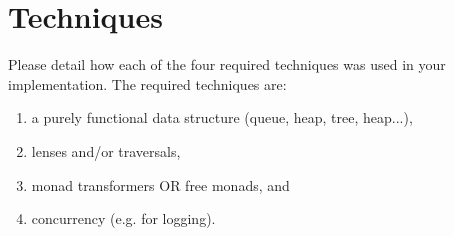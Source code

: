 \section{Techniques}

Please detail how each of the four required techniques was used in your implementation.
The required techniques are:
\begin{enumerate}
    \item a purely functional data structure (queue, heap, tree, heap...),
    \item lenses and/or traversals,
    \item monad transformers OR free monads, and
    \item concurrency (e.g. for logging).
\end{enumerate}
